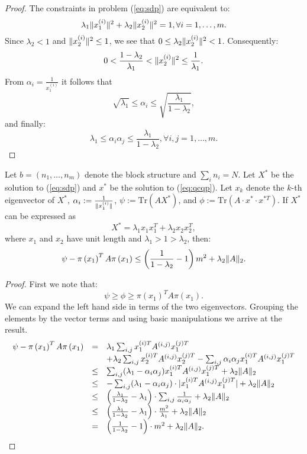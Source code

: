 \begin{proof}
The constraints in problem (\ref{eq:sdp}) are equivalent to:
$$\lambda_1 \lVert x_1^{(i)}\rVert^2 + \lambda_2 \lVert x_2^{(i)}\rVert^2 = 1, \forall i = 1,\ldots, m.$$
Since $\lambda_2 < 1$ and $\lVert x_2^{(i)}\rVert^2 \leq 1$,
we see that $0 \leq \lambda_2 \lVert x_2^{(i)}\rVert^2  < 1$.
Consequently:
$$  0 < \frac{1- \lambda_2}{\lambda_1} < \lVert x_2^{(i)}\rVert^2 \leq \frac{1}{\lambda_1}.$$
From $\alpha_i = \frac{1}{x_1^{(i)}}$ it follows that
$$ \sqrt{\lambda_1} \leq \alpha_i \leq \sqrt{\frac{\lambda_1}{1-\lambda_2}},$$
and finally:
$$ \lambda_1 \leq \alpha_i \alpha_j \leq \frac{\lambda_1}{1-\lambda_2}, \forall i,j = 1,\ldots,m.$$
\end{proof}

\begin{proposition}\label{thm:rank2sdp_solution}
Let $b = \left(n_1,\ldots,n_m\right)$ denote the block structure and $ \sum_i n_i = N $.
Let $X^*$ be the solution to (\ref{eq:sdp}) and $x^{*}$ be the solution to  (\ref{eq:qcqp}).
Let $x_k$ denote the $k$-th eigenvector of $X^*$, $\alpha_i := \frac{1}{\lVert x_1^{(i)}\rVert}$,
$\psi := \mathrm{Tr}\left(A X^{*}\right)$, and $\phi := \mathrm{Tr}\left(A \cdot x^{*} \cdot x^{*T}\right)$.
If $X^*$ can be expressed as
$$X^* = \lambda_1  x_1 x_1^T + \lambda_2 x_2 x_2^T,$$
where $x_1$ and $x_2$ have unit length and $\lambda_1 > 1 >  \lambda_2$,
 then: $$\psi - \pi\left(x_1\right)^T A \pi\left(x_1\right) \leq \left(\frac{1}{1-\lambda_2} -1\right)  m^2 + \lambda_2 \lVert A\rVert_2.$$
\end{proposition}

\begin{proof}
First we note that: $$\psi \geq \phi \geq \pi\left(x_1\right)^T A \pi\left(x_1\right).$$
We can expand the left hand side in terms of the two eigenvectors. Grouping the
elements by the vector terms and using basic manipulations we arrive at the result.
\[
\begin{array}{rcl}
\psi - \pi\left(x_1\right)^T A \pi\left(x_1\right) & = & \lambda_1 \sum_{i,j} x_1^{(i)T} A^{(i,j)} x_1^{(j)T}  \\
& & + \lambda_2\sum_{i,j} x_2^{(i)T} A^{(i,j)} x_2^{(j)T} - \sum_{i,j} \alpha_i \alpha_j x_1^{(i)T} A^{(i,j)} x_1^{(j)T}   \\
&\leq & \sum_{i,j} (\lambda_1 - \alpha_i \alpha_j) x_1^{(i)T} A^{(i,j)} x_1^{(j)T}  + \lambda_2 \lVert A\rVert_2 \\
&\leq & -\sum_{i,j} (\lambda_1 - \alpha_i \alpha_j)\cdot |x_1^{(i)T} A^{(i,j)} x_1^{(j)T}| +  \lambda_2 \lVert A\rVert_2 \\
&\leq & \left(\frac{\lambda_1}{1-\lambda_2} - \lambda_1 \right)\cdot \sum_{i,j}  \frac{1}{\alpha_i \alpha_j} +  \lambda_2 \lVert A\rVert_2 \\
&\leq & \left(\frac{\lambda_1}{1-\lambda_2} - \lambda_1 \right)\cdot \frac{m^2}{\lambda_1} +  \lambda_2 \lVert A\rVert_2 \\
&= & \left(\frac{1}{1-\lambda_2} - 1 \right)\cdot m^2 +  \lambda_2 \lVert A\rVert_2.
\end{array}
\]
\end{proof}

